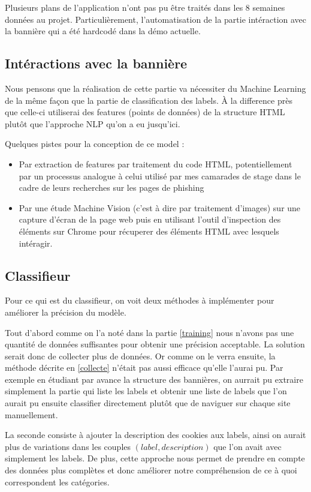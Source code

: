\documentclass[oneside,a4paper,12pt]{article}
\begin{document}
	Plusieurs plans de l'application n'ont pas pu être traités dans les 8 semaines données au projet. Particulièrement, l'automatisation de la partie intéraction avec la bannière qui a été hardcodé dans la démo actuelle.
	
	\subsection{Intéractions avec la bannière}
	Nous pensons que la réalisation de cette partie va nécessiter du Machine Learning de la même façon que la partie de classification des labels. \`A la difference près que celle-ci utiliserai des features (points de données) de la structure HTML plutôt que l'approche NLP qu'on a eu jusqu'ici.
	
	Quelques pistes pour la conception de ce model :
	\begin{itemize}
		\item Par extraction de features par traitement du code HTML, potentiellement par un processus analogue à celui utilisé par mes camarades de stage dans le cadre de leurs recherches sur les pages de phishing \cite{phishing}
		\item Par une étude Machine Vision (c'est à dire par traitement d'images) sur une capture d'écran de la page web puis en utilisant l'outil d'inspection des éléments sur Chrome pour récuperer des éléments HTML avec lesquels intéragir.
	\end{itemize}
	
	\subsection{Classifieur}
	Pour ce qui est du classifieur, on voit deux méthodes à implémenter pour améliorer la précision du modèle.
	
	Tout d'abord comme on l'a noté dans la partie \ref{training} nous n'avons pas une quantité de données suffisantes pour obtenir une précision acceptable. La solution serait donc de collecter plus de données. Or comme on le verra ensuite, la méthode décrite en \ref{collecte} n'était pas aussi efficace qu'elle l'aurai pu. Par exemple en étudiant par avance la structure des bannières, on aurrait pu extraire simplement la partie qui liste les labels et obtenir une liste de labels que l'on aurait pu ensuite classifier directement plutôt que de naviguer sur chaque site manuellement.
	
	La seconde consiste à ajouter la description des cookies aux labels, ainsi on aurait plus de variations dans les couples $(label, description)$ que l'on avait avec simplement les labels.
	De plus, cette approche nous permet de prendre en compte des données plus complètes et donc améliorer notre compréhension de ce à quoi correspondent les catégories.
	
\end{document}
